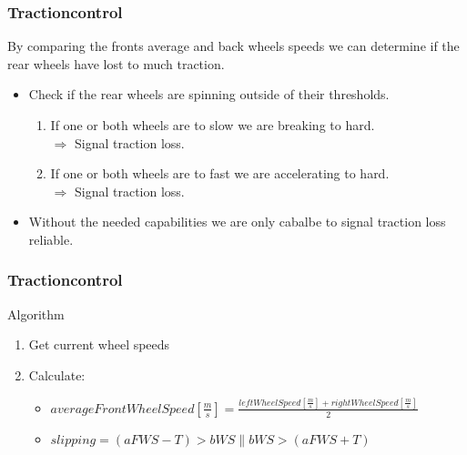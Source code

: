 \documentclass{beamer}
\begin{document}
\begin{frame}
    \frametitle{Tractioncontrol}
    By comparing the fronts average and back wheels speeds we can determine if the rear wheels have lost to much traction.
    \begin{itemize}
    \item Check if the rear wheels are spinning outside of their thresholds.\\
        \begin{enumerate}
        \item If one or both wheels are to slow we are breaking to hard.\\
        $\Rightarrow$ Signal traction loss.\\
        \item If one or both wheels are to fast we are accelerating to hard.\\
        $\Rightarrow$ Signal traction loss.
        \end{enumerate}
     \item Without the needed capabilities we are only cabalbe to signal traction loss reliable.
    \end{itemize}
\end{frame}
\begin{frame}
    \frametitle{Tractioncontrol}
    Algorithm
    \begin{enumerate}
        \item Get current wheel speeds
        \item Calculate: 
        \begin{itemize}
            \item $averageFrontWheelSpeed\left[ \frac{m}{s} \right] = \frac{leftWheelSpeed\left[ \frac{m}{s} \right] + rightWheelSpeed\left[ \frac{m}{s} \right]}{2}$
            \item $slipping = (aFWS-T) > bWS \parallel bWS > (aFWS+T)$
        \end{itemize}
    \end{enumerate}
\end{frame}
\end{document}
